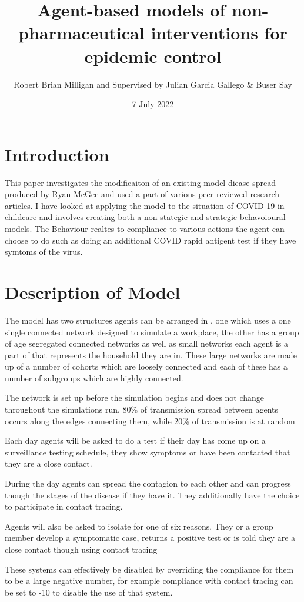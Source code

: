 \documentclass{article}
\title{Agent-based models of non-pharmaceutical interventions for epidemic control}
\author{Robert Brian Milligan and Supervised by Julian Garcia Gallego \& Buser Say}
\date{7 July 2022}
\begin{document}
\maketitle

\section{Introduction}
This paper investigates the modificaiton of an existing model diease spread produced by Ryan McGee and used a part of various peer reviewed research articles. I have looked at applying the model to the situation of COVID-19 in childcare and involves creating both a non stategic and strategic behavoioural models. The Behaviour realtes to compliance to various actions the agent can choose to do such as doing an additional COVID rapid antigent test if they have symtoms of the virus.

\section{Description of Model}
The model has two structures agents can be arranged in , one which uses a one single connected network designed to simulate a workplace, the other has a group of age segregated connected networks as well as small networks each agent is a part of that represents the household they are in. These large networks are made up of a number of cohorts which are loosely connected and each of these has a number of subgroups which are highly connected.

The network is set up before the simulation begins and does not change throughout the simulations run. 80\% of transmission spread between agents occurs along the edges connecting them, while 20\% of transmission is at  random

Each day agents will be asked to do a test if their day has come up on a surveillance testing schedule, they show symptoms or have been contacted that they are a close contact.

During the day agents can spread the contagion to each other and can progress though the stages of the disease if they have it. They additionally have the choice to participate in contact tracing.

Agents will also be asked to isolate for one of six reasons. They or a group member develop a symptomatic case, returns a positive test or is told they are a close contact though using contact tracing

These systems can effectively be disabled by overriding the compliance for them to be a large negative number, for example compliance with contact tracing can be set to -10 to disable the use of that system.
\end{document}
